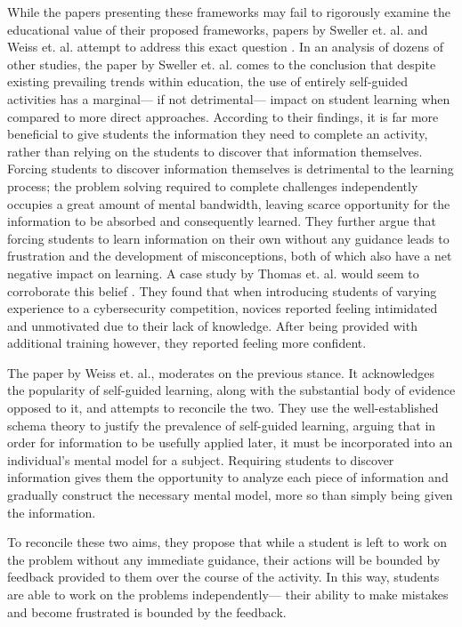     While the papers presenting these frameworks may fail to rigorously examine the educational value of their proposed frameworks, papers by Sweller et. al. and Weiss et. al. attempt to address this exact question \cite{J-Sweller,R-Weiss}. %
In an analysis of dozens of other studies, the paper by Sweller et. al. comes to the conclusion that despite existing prevailing trends within education, the use of entirely self-guided activities has a marginal---%
if not detrimental---%
impact on student learning when compared to more direct approaches. %
According to their findings, it is far more beneficial to give students the information they need to complete an activity, rather than relying on the students to discover that information themselves. 
    Forcing students to discover information themselves is detrimental to the learning process; %
the problem solving required to complete challenges independently occupies a great amount of mental bandwidth, leaving scarce opportunity for the information to be absorbed and consequently learned. 
    They further argue that forcing students to learn information on their own without any guidance leads to frustration and the development of misconceptions, both of which also have a net negative impact on learning. 
    A case study by Thomas et. al. would seem to corroborate this belief \cite{L-Thomas}. %
They found that when introducing students of varying experience to a cybersecurity competition, novices reported feeling intimidated and unmotivated due to their lack of knowledge. %
After being provided with additional training however, they reported feeling more confident. 

    The paper by Weiss et. al., moderates on the previous stance. %
It acknowledges the popularity of self-guided learning, along with the substantial body of evidence opposed to it, and attempts to reconcile the two. %
They use the well-established schema theory to justify the prevalence of self-guided learning, arguing that in order for information to be usefully applied later, it must be incorporated into an individual's mental model for a subject. 
    Requiring students to discover information gives them the opportunity to analyze each piece of information and gradually construct the necessary mental model, more so than simply being given the information. 

    To reconcile these two aims, they propose that while a student is left to work on the problem without any immediate guidance, their actions will be bounded by feedback provided to them over the course of the activity. 
    In this way, students are able to work on the problems independently---%
their ability to make mistakes and become frustrated is bounded by the feedback. 

